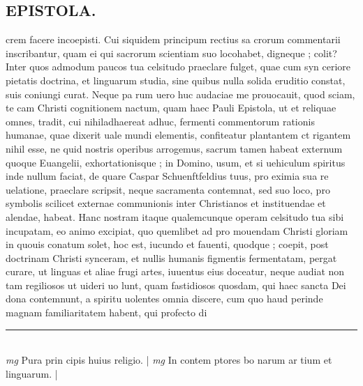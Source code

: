 \documentclass{article}
\begin{document}
\begin{pages}
\section*{EPISTOLA.  }\pstart crem facere incoepisti. Cui siquidem principum rectius sa crorum commentarii inscribantur, quam ei qui sacrorum scientiam suo locohabet, digneque ; colit? Inter quos admodum paucos tua celsitudo praeclare fulget, quae cum syn ceriore pietatis doctrina, et linguarum studia, sine quibus nulla solida eruditio constat, suis coniungi curat. Neque  pa rum uero huc audaciae me prouocauit, quod sciam, te cam Christi cognitionem nactum, quam haec Pauli Epistola, ut et reliquae omnes, tradit, cui nihiladhaereat adhuc, fermenti commentorum rationis humanae, quae dixerit uale mundi elementis, confiteatur plantantem ct rigantem nihil esse, ne quid nostris operibus arrogemus, sacrum tamen habeat externum quoque  Euangelii, exhortationisque ; in Domino, usum, et si uehiculum spiritus inde nullum faciat, de quare Caspar Schuenftfeldius tuus, pro eximia sua re uelatione, praeclare scripsit, neque  sacramenta contemnat, sed suo loco, pro symbolis scilicet externae communionis inter Christianos et instituendae et alendae, habeat.   \pend\pstart Hanc nostram itaque  qualemcunque operam celsitudo tua sibi incupatam, eo animo excipiat, quo quemlibet ad pro mouendam Christi gloriam in quouis conatum solet, hoc est, iucundo et fauenti, quodque ; coepit, post doctrinam Christi synceram, et nullis humanis figmentis fermentatam, pergat curare, ut linguas et aliae frugi artes, iuuentus eius doceatur, neque  audiat non tam regiliosos ut uideri uo lunt, quam fastidiosos quosdam, qui haec sancta Dei dona contemnunt, a spiritu uolentes omnia discere, cum quo haud perinde magnam familiaritatem habent, qui profecto di\pend
\vspace{0.5cm}\noindent
\vspace{0.2cm}\rule{1cm}{0.2pt}\\ 
\hspace{0.2cm}\textit{mg}
\footnotesize Pura prin cipis huius religio.  
\normalsize| 
\hspace{0.2cm}\textit{mg}
\footnotesize In contem ptores bo narum ar tium et linguarum.  
\normalsize| 

\end{pages}
\end{document}
